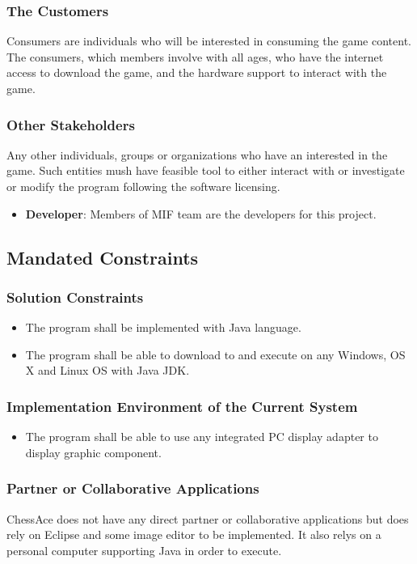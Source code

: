 \documentclass[12pt, titlepage]{article}
\begin{document}
\subsubsection{The Customers}
Consumers are individuals who will be interested in consuming the game content. The consumers, which members involve with all ages, who have the internet access to download the game, and the hardware support to interact with the game.
\subsubsection{Other Stakeholders}
Any other individuals, groups or organizations who have an interested in the game. Such entities mush have feasible tool to either interact with or investigate or modify the program following the software licensing.
\begin{itemize}
\item \textbf{Developer}: Members of MIF team are the developers for this project.
\end{itemize}


\subsection{Mandated Constraints}
\subsubsection{Solution Constraints}
\begin{itemize}
\item The program shall be implemented with Java language.
\item The program shall be able to download to and execute on any Windows, OS X and Linux OS with Java JDK.
\end{itemize}
\subsubsection{Implementation Environment of the Current System}
\begin{itemize}
\item The program shall be able to use any integrated PC display adapter to display graphic component.
\end{itemize}
\subsubsection{Partner or Collaborative Applications}
ChessAce does not have any direct partner or collaborative applications but does rely on Eclipse and some image editor to be implemented. It also relys on a personal computer supporting Java in order to execute.
\end{document}
